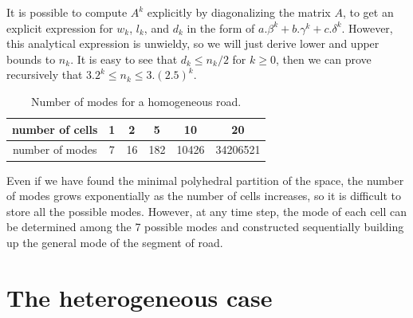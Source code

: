 \documentclass[11pt]{article}
\numberwithin{equation}{section}
\numberwithin{figure}{section}
\numberwithin{table}{section}
\begin{document}
It is possible to compute $A^{k}$ explicitly by diagonalizing the matrix $A$, to get an explicit expression for $w_{k}$, $l_{k}$, and $d_{k}$ in the form of $a.\beta^{k} + b.\gamma^{k} + c.\delta^{k}$. However, this analytical expression is unwieldy, so we will just derive lower and upper bounds to $n_{k}$. It is easy to see that $d_{k} \leq n_{k}/2$ for $k\geq 0$, then we can prove recursively that $3.2^{k} \leq n_{k} \leq 3.(2.5)^{k}$.

\begin{table}[ht]
\centering %
\begin{tabular}{|c|c|c|c|c|c|}
  \hline
 number of cells & 1 & 2 & 5 & 10 & 20\\
  \hline
 number of modes & 7 & 16 & 182 & 10426 & 34206521\\
  \hline
\end{tabular}
\label{table:numModes} %
\caption{Number of modes for a homogeneous road.}
\end{table}

Even if we have found the minimal polyhedral partition of the space, the number of modes grows exponentially as the number of cells increases, so it is difficult to store all the possible modes. However, at any time step, the mode of each cell can be determined among the 7 possible modes and constructed sequentially building up the general mode of the segment of road.


\section{The heterogeneous case}\label{sec:CDFD}
\end{document}
